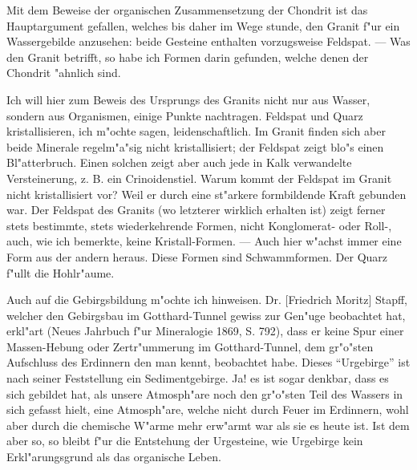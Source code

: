\documentclass[a4paper, 11pt, oneside]{article}
\begin{document}
Mit dem Beweise der organischen Zusammensetzung der Chondrit ist das Hauptargument gefallen, welches bis daher im Wege stunde, den Granit f"ur ein Wassergebilde anzusehen: beide Gesteine enthalten vorzugsweise Feldspat. --- Was den Granit betrifft, so habe ich Formen darin gefunden, welche denen der Chondrit "ahnlich sind.

Ich will hier zum Beweis des Ursprungs des Granits nicht nur aus Wasser, sondern aus Organismen, einige Punkte nachtragen. Feldspat und Quarz kristallisieren, ich m"ochte sagen, leidenschaftlich. Im Granit finden sich aber beide Minerale regelm"a"sig nicht kristallisiert; der Feldspat zeigt blo"s einen Bl"atterbruch. Einen solchen zeigt aber auch jede in Kalk verwandelte Versteinerung, z. B. ein Crinoidenstiel. Warum kommt der Feldspat im Granit nicht kristallisiert vor? Weil er durch eine st"arkere formbildende Kraft gebunden war. Der Feldspat des Granits (wo letzterer wirklich erhalten ist) zeigt ferner stets bestimmte, stets wiederkehrende Formen, nicht Konglomerat- oder Roll-, auch, wie ich bemerkte, keine Kristall-Formen. --- Auch hier w"achst immer eine Form aus der andern heraus. Diese Formen sind Schwammformen. Der Quarz f"ullt die Hohlr"aume.

Auch auf die Gebirgsbildung m"ochte ich hinweisen. Dr. [Friedrich Moritz] Stapff, welcher den Gebirgsbau im Gotthard-Tunnel gewiss zur Gen"uge beobachtet hat, erkl"art (Neues Jahrbuch f"ur Mineralogie 1869, S. 792), dass er keine Spur einer Massen-Hebung oder Zertr"ummerung im Gotthard-Tunnel, dem gr"o"sten Aufschluss des Erdinnern den man kennt, beobachtet habe. Dieses "`Urgebirge"' ist nach seiner Feststellung ein Sedimentgebirge. Ja! es ist sogar denkbar, dass es sich gebildet hat, als unsere Atmosph"are noch den gr"o"sten Teil des Wassers in sich gefasst hielt, eine Atmosph"are, welche nicht durch Feuer im Erdinnern, wohl aber durch die chemische W"arme mehr erw"armt war als sie es heute ist. Ist dem aber so, so bleibt f"ur die Entstehung der Urgesteine, wie Urgebirge kein Erkl"arungsgrund als das organische Leben.
\end{document}
